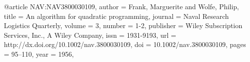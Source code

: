 

@article {NAV:NAV3800030109,
author = {Frank, Marguerite and Wolfe, Philip},
title = {An algorithm for quadratic programming},
journal = {Naval Research Logistics Quarterly},
volume = {3},
number = {1-2},
publisher = {Wiley Subscription Services, Inc., A Wiley Company},
issn = {1931-9193},
url = {http://dx.doi.org/10.1002/nav.3800030109},
doi = {10.1002/nav.3800030109},
pages = {95--110},
year = {1956},
}

